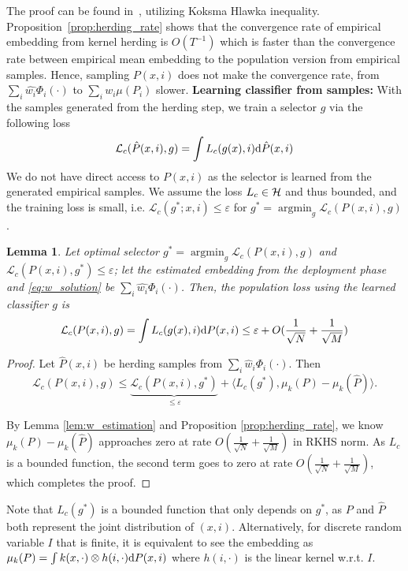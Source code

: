 \documentclass[paper=letter, fontsize=20pt]{article}
\newcommand*\argmin{\mathop{\arg \min}}
\newtheorem{Lemma}{Lemma}
\begin{document}
The proof can be found in~\cite{kernel_herding}, utilizing Koksma Hlawka inequality. Proposition~\ref{prop:herding_rate} shows that the convergence rate of empirical embedding from kernel herding is $O(T^{-1})$ which is faster than the convergence rate between empirical mean embedding to the population version from empirical samples. Hence, sampling $P(x,i)$ does not make the convergence rate, from $\sum_i \hat{w_i}\Phi_i(\cdot)$ to $\sum_i w_i \mu(P_i)$ slower.
\newline
\textbf{Learning classifier from samples:} 
With the samples generated from the herding step, we train a selector $g$ via the following loss 
$$
\mathcal{L}_c(\hat{P}(x,i),g) = \int L_c(g(x), i) \mathrm{d}\hat{P}(x,i)
$$
We do not have direct access to $P(x,i)$ as the selector is learned from the generated empirical samples. 
We assume the loss $L_c \in \mathcal{H}$ and thus bounded, and the training loss is small, i.e. $\mathcal{L}_c(g^{\ast}; x,i) \leq \varepsilon$ for $g^{\ast}= \argmin_g{\mathcal{L}_c(P(x,i),g)}
$.

\begin{Lemma}\label{lem:classifier_error}
Let optimal selector $g^{\ast}= \argmin_g{\mathcal{L}_c(P(x,i),g)}$ and $\mathcal{L}_c(P(x,i),g^{\ast}) \leq \varepsilon$; let the estimated embedding from the deployment phase and \eqref{eq:w_solution} be $\sum_i\hat{w_i}\Phi_i(\cdot)$. Then, the population loss using the learned classifier $g$ is
$$
\mathcal{L}_c(P(x,i),g) = \int L_c(g(x), i) \mathrm{d} P(x,i)
\leq \varepsilon + O(\frac{1}{\sqrt{N}} + \frac{1}{\sqrt{M}})$$
\end{Lemma}
\begin{proof}
Let $\hat{P}(x,i)$ be herding samples from $\sum_i \hat{w}_i \Phi_i(\cdot)$. Then
$$
\mathcal{L}_c(P(x,i),g) \leq
\underset{{\leq \varepsilon}}{\underbrace{\mathcal{L}_c(P(x,i),g^{\ast})}}
+ \langle L_c(g^{\ast}) , \mu_k(P) - \mu_k(\hat{P})\rangle.
$$

By Lemma \ref{lem:w_estimation} and Proposition \ref{prop:herding_rate}, we know $\mu_k(P) - \mu_k(\hat{P})$ approaches zero at rate $ O(\frac{1}{\sqrt{N}} + \frac{1}{\sqrt{M}})$ in RKHS norm. As $L_c$ is a bounded function, the second term goes to zero at rate $ O(\frac{1}{\sqrt{N}} + \frac{1}{\sqrt{M}})$, which completes the proof.
\end{proof}
Note that $L_c(g^{\ast})$ is a bounded function that only depends on $g^{\ast}$, as $P$ and $\hat{P}$ both represent the joint distribution of $(x,i)$. Alternatively, for discrete random variable $I$ that is finite, it is equivalent to see the embedding as $\mu_k(P) = \int k(x,\cdot) \otimes h(i,\cdot) \mathrm{d} P(x,i)$ where $h(i,\cdot)$ is the linear kernel w.r.t. $I$. 
\end{document}
